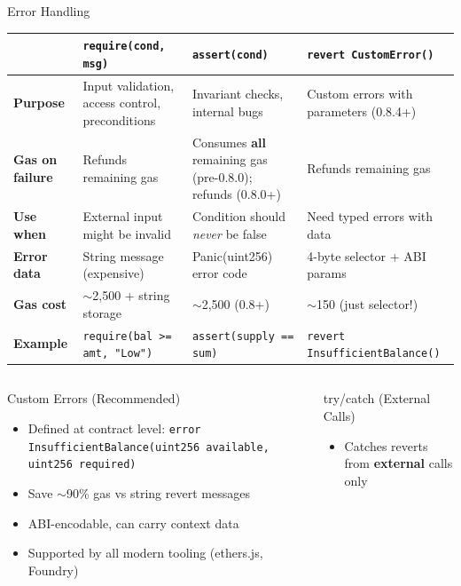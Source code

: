 \documentclass[8pt,aspectratio=169]{beamer}
\begin{document}
\begin{frame}{Error Handling}
\begin{center}
\small
\begin{tabular}{@{}p{2.5cm}p{3.8cm}p{3.8cm}p{3.8cm}@{}}
\toprule
& \textbf{\texttt{require(cond, msg)}} & \textbf{\texttt{assert(cond)}} & \textbf{\texttt{revert CustomError()}} \\
\midrule
\textbf{Purpose} & Input validation, access control, preconditions & Invariant checks, internal bugs & Custom errors with parameters (0.8.4+) \\
\textbf{Gas on failure} & Refunds remaining gas & Consumes \textbf{all} remaining gas (pre-0.8.0); refunds (0.8.0+) & Refunds remaining gas \\
\textbf{Use when} & External input might be invalid & Condition should \emph{never} be false & Need typed errors with data \\
\textbf{Error data} & String message (expensive) & Panic(uint256) error code & 4-byte selector + ABI params \\
\textbf{Gas cost} & $\sim$2,500 + string storage & $\sim$2,500 (0.8+) & $\sim$150 (just selector!) \\
\textbf{Example} & \texttt{require(bal >= amt, "Low")} & \texttt{assert(supply == sum)} & \texttt{revert InsufficientBalance()} \\
\bottomrule
\end{tabular}
\end{center}
\vspace{2mm}
\begin{columns}
\begin{block}{Custom Errors (Recommended)}
\begin{itemize}\small
  \item Defined at contract level: \texttt{error InsufficientBalance(uint256 available, uint256 required)}
  \item Save $\sim$90\% gas vs string revert messages
  \item ABI-encodable, can carry context data
  \item Supported by all modern tooling (ethers.js, Foundry)
\end{itemize}
\end{block}
\begin{block}{try/catch (External Calls)}
\begin{itemize}\small
  \item Catches reverts from \textbf{external} calls only

\end{itemize}
\end{block}
\end{columns}
\end{frame}
\end{document}
